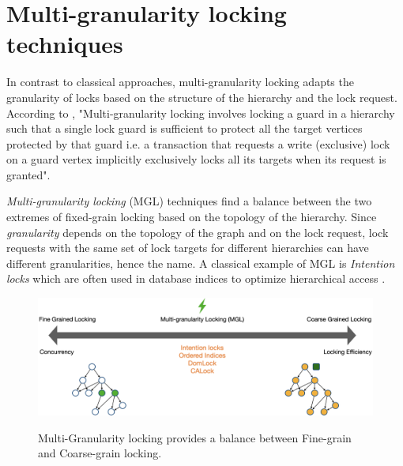 


\section{Multi-granularity locking techniques}

In contrast to classical approaches, multi-granularity locking adapts the granularity of locks based on the structure of the hierarchy and the lock request. 
According to \citet{gray1975granularity}, "Multi-granularity locking involves locking a guard in a hierarchy such that a single lock guard is sufficient to protect all the target vertices protected by that guard i.e. a transaction that requests a write (exclusive) lock on a guard vertex implicitly exclusively locks all its targets when its request is granted". 



\emph{Multi-granularity locking} (MGL) \cite{gray1975granularity} techniques find a balance between the two extremes of fixed-grain locking based on the topology of the hierarchy.
Since \emph{granularity} depends on the topology of the graph and on the lock request, lock requests with the same set of lock targets for different hierarchies can have different granularities, hence the name. A classical example of MGL is \emph{Intention locks} \cite{StonebrakerGranularity} which are often used in database indices to optimize hierarchical access \cite{sqlintentionlocks}. 

\begin{figure}[h]
    \captionsetup{justification=centering}
    \includegraphics[width=\textwidth]{figures/MGLSpectrum.png}
    \label{fig:mglspectrum}
    \caption{Multi-Granularity locking provides a balance between Fine-grain and Coarse-grain locking.}
\end{figure}



